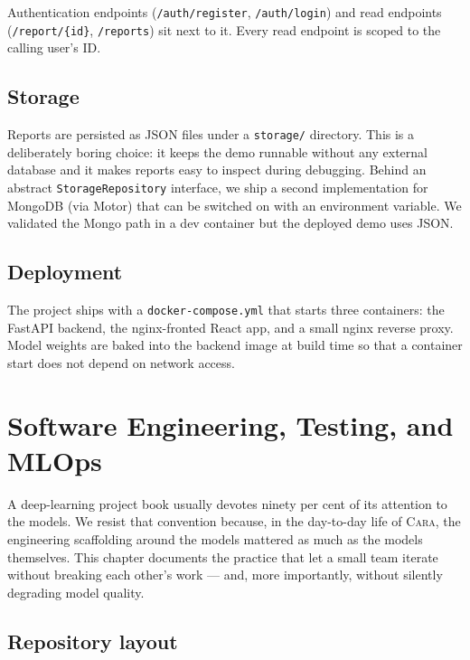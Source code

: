 \documentclass[11pt,a4paper,oneside]{report}
\newcommand{\cara}{\textsc{Cara}\xspace}
\begin{document}
Authentication endpoints (\texttt{/auth/register},
\texttt{/auth/login}) and read endpoints (\texttt{/report/\{id\}},
\texttt{/reports}) sit next to it. Every read endpoint is scoped
to the calling user's ID.

\section{Storage}

Reports are persisted as JSON files under a \texttt{storage/}
directory. This is a deliberately boring choice: it keeps the demo
runnable without any external database and it makes reports easy
to inspect during debugging. Behind an abstract
\texttt{StorageRepository} interface, we ship a second
implementation for MongoDB (via Motor) that can be switched on
with an environment variable. We validated the Mongo path in a
dev container but the deployed demo uses JSON.

\section{Deployment}

The project ships with a \texttt{docker-compose.yml} that starts
three containers: the FastAPI backend, the nginx-fronted React
app, and a small nginx reverse proxy. Model weights are baked into
the backend image at build time so that a container start does not
depend on network access.

\chapter{Software Engineering, Testing, and MLOps}\label{ch:engineering}

A deep-learning project book usually devotes ninety per cent of its
attention to the models. We resist that convention because, in the
day-to-day life of \cara, the engineering scaffolding around the
models mattered as much as the models themselves. This chapter
documents the practice that let a small team iterate without
breaking each other's work --- and, more importantly, without
silently degrading model quality.

\section{Repository layout}
\end{document}
